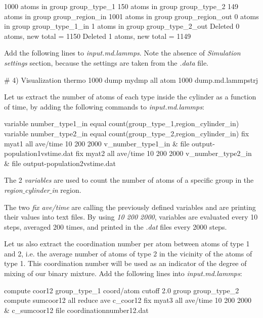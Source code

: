 \begin{lcverbatim}
1000 atoms in group group_type_1
150 atoms in group group_type_2
149 atoms in group group_region_in
1001 atoms in group group_region_out
0 atoms in group group_type_1_in
1 atoms in group group_type_2_out
Deleted 0 atoms, new total = 1150
Deleted 1 atoms, new total = 1149
\end{lcverbatim}

\noindent Add the following lines to \textit{input.md.lammps}.
Note the absence of \textit{Simulation settings} section,
because the settings are taken from the \textit{.data} file.

\begin{lcverbatim}
# 4) Visualization
thermo 1000
dump mydmp all atom 1000 dump.md.lammpstrj
\end{lcverbatim}

\noindent Let us extract the number of atoms of each type
inside the cylinder as a function of time, by
adding the following commands to \textit{input.md.lammps}:

\begin{lcverbatim}
variable number_type1_in equal count(group_type_1,region_cylinder_in)
variable number_type2_in equal count(group_type_2,region_cylinder_in)
fix myat1 all ave/time 10 200 2000 v_number_type1_in &
    file output-population1vstime.dat
fix myat2 all ave/time 10 200 2000 v_number_type2_in &
    file output-population2vstime.dat
\end{lcverbatim}

\noindent The 2 \textit{variables} are used to count
the number of atoms of a specific group in the \textit{region$\_$cylinder$\_$in} region. 

\vspace{0.25cm} \noindent The two \textit{fix ave/time}
are calling the previously defined variables and are printing
their values into text files.
By using \textit{10 200 2000}, variables are evaluated every 10 steps, 
averaged 200 times, and printed in the \textit{.dat} files every 2000 steps.

\vspace{0.25cm} \noindent Let us also extract the coordination number per atom between atoms 
of type 1 and 2, i.e. the average number of atoms of type 2 in the vicinity 
of the atoms of type 1. This coordination number will be used as
an indicator of the degree of mixing of our binary mixture. 
Add the following lines into \textit{input.md.lammps}:

\begin{lcverbatim}
compute coor12 group_type_1 coord/atom cutoff 2.0 group group_type_2
compute sumcoor12 all reduce ave c_coor12
fix myat3 all ave/time 10 200 2000 &
    c_sumcoor12 file coordinationnumber12.dat
\end{lcverbatim}

